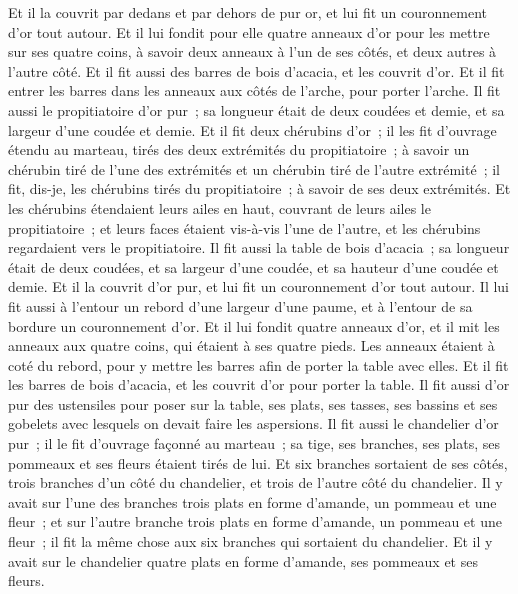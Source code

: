 \begin{multicols}{2}
Et il la couvrit par dedans et par dehors de pur or, et lui fit un couronnement d'or tout autour.
Et il lui fondit pour elle quatre anneaux d'or pour les mettre sur ses quatre coins, à savoir deux anneaux à l'un de ses côtés, et deux autres à l'autre côté.
Et il fit aussi des barres de bois d'acacia, et les couvrit d'or.
Et il fit entrer les barres dans les anneaux aux côtés de l'arche, pour porter l'arche.
Il fit aussi le propitiatoire d'or pur~; sa longueur était de deux coudées et demie, et sa largeur d'une coudée et demie.
Et il fit deux chérubins d'or~; il les fit d'ouvrage étendu au marteau, tirés des deux extrémités du propitiatoire~;
à savoir un chérubin tiré de l'une des extrémités et un chérubin tiré de l'autre extrémité~; il fit, dis-je, les chérubins tirés du propitiatoire~; à savoir de ses deux extrémités.
Et les chérubins étendaient leurs ailes en haut, couvrant de leurs ailes le propitiatoire~; et leurs faces étaient vis-à-vis l'une de l'autre, et les chérubins regardaient vers le propitiatoire.
Il fit aussi la table de bois d'acacia~; sa longueur était de deux coudées, et sa largeur d'une coudée, et sa hauteur d'une coudée et demie.
Et il la couvrit d'or pur, et lui fit un couronnement d'or tout autour.
Il lui fit aussi à l'entour un rebord d'une largeur d'une paume, et à l'entour de sa bordure un couronnement d'or.
Et il lui fondit quatre anneaux d'or, et il mit les anneaux aux quatre coins, qui étaient à ses quatre pieds.
Les anneaux étaient à coté du rebord, pour y mettre les barres afin de porter la table avec elles.
Et il fit les barres de bois d'acacia, et les couvrit d'or pour porter la table.
Il fit aussi d'or pur des ustensiles pour poser sur la table, ses plats, ses tasses, ses bassins et ses gobelets avec lesquels on devait faire les aspersions.
Il fit aussi le chandelier d'or pur~; il le fit d'ouvrage façonné au marteau~; sa tige, ses branches, ses plats, ses pommeaux et ses fleurs étaient tirés de lui.
Et six branches sortaient de ses côtés, trois branches d'un côté du chandelier, et trois de l'autre côté du chandelier.
Il y avait sur l'une des branches trois plats en forme d'amande, un pommeau et une fleur~; et sur l'autre branche trois plats en forme d'amande, un pommeau et une fleur~; il fit la même chose aux six branches qui sortaient du chandelier.
Et il y avait sur le chandelier quatre plats en forme d'amande, ses pommeaux et ses fleurs.

\end{multicols}
